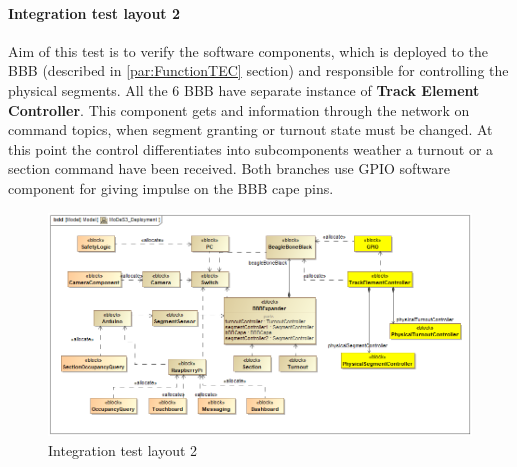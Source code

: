 \paragraph{Integration test layout 2}
Aim of this test is to verify the software components, which is deployed to the BBB (described in \ref{par:FunctionTEC} section) and responsible for controlling the physical segments. All the 6 BBB have separate instance of \textbf{Track Element Controller}. This component gets and information through the network on command topics, when segment granting or turnout state must be changed. At this point the control differentiates into subcomponents weather a turnout or a section command have been received. Both branches use GPIO software component for giving impulse on the BBB cape pins. 
\begin{figure}[!h]
	\centering
	\includegraphics[width=150mm, keepaspectratio]{figures/testDesign/testLayoutSYSML/MoDeS3_Deployment-test2.png}
	\caption{Integration test layout 2}
	\label{fig:MoDeS3_Deployment-test2}
\end{figure}

